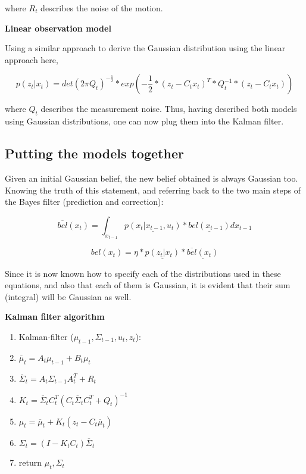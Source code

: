 \documentclass[a4paper]{article}
\begin{document}
where $R_t$ describes the noise of the motion.

\textbf{Linear observation model}

Using a similar approach to derive the Gaussian distribution using the linear approach here,

\begin{equation*}
    p(z_t| x_t) = det(2\pi Q_t)^{-\frac{1}{2}} * exp(-\frac{1}{2} * (z_t - C_t x_t)^T * Q_t^{-1} * (z_t - C_t x_t) )
\end{equation*}

where $Q_t$ describes the measurement noise. Thus, having described both models using Gaussian distributions, one can now plug them into the Kalman filter.

\subsection{Putting the models together}

Given an initial Gaussian belief, the new belief obtained is always Gaussian too. Knowing the truth of this statement, and referring back to the two main steps of the Bayes filter (prediction and correction):

\begin{equation*}
    \overline{bel}(x_t) = \int_{x_{t-1}} \underline{p(x_t | x_{t-1}, u_t)} * \underline{bel(x_{t-1})} dx_{t-1}
\end{equation*}

\begin{equation*}
    bel(x_t) = \eta * \underline{p(z_t | x_t)} * \underline{\overline{bel}(x_t)}
\end{equation*}

Since it is now known how to specify each of the distributions used in these equations, and also that each of them is Gaussian, it is evident that their sum (integral) will be Gaussian as well.

\textbf{Kalman filter algorithm}

\begin{enumerate}
    \item Kalman-filter ($\mu_{t-1}, \Sigma_{t-1}, u_t, z_t$):
    \item \hspace{2em} $\overline{\mu}_t = A_t \mu_{t-1} + B_t \mu_t$
    \item \hspace{2em}  $\overline{\Sigma}_t = A_t \Sigma_{t-1} A_t^T + R_t$
    \item \hspace{2em} $K_t = \overline{\Sigma}_t C_t^T (C_t \overline{\Sigma}_t C_t^T + Q_t) ^{-1}$
    \item \hspace{2em} $\mu_t = \overline{\mu}_t + K_t(z_t - C_t \overline{\mu}_t)$
    \item \hspace{2em} $\Sigma_t = (I - K_t C_t) \overline{\Sigma}_t$
    \item \hspace{2em} return $\mu_t, \Sigma_t$
\end{enumerate}
\end{document}
